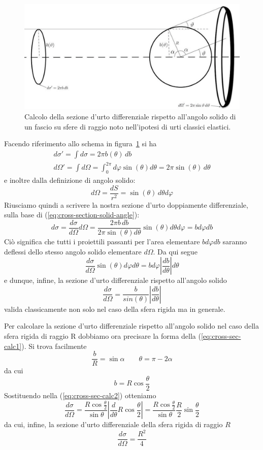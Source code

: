 \begin{figure}
	\centering
	\includegraphics{figs/ex-cross-section}
	\caption{Calcolo della sezione d'urto differenziale rispetto all'angolo solido di un fascio su sfere di raggio noto
	nell'ipotesi di urti classici elastici.}
	\label{fig:ex-cross-section}
\end{figure}
Facendo riferimento allo schema in figura~\ref{fig:ex-cross-section} si ha
\begin{gather*}
    d \sigma' = \int d \sigma = 2 \pi b(\theta) \, db\\
    d \Omega' = \int d \Omega = \int_{0}^{2 \pi} d \varphi \sin(\theta) d \theta = 2 \pi \sin(\theta) \, d \theta
\end{gather*}
e inoltre dalla definizione di angolo solido:
\[
 d \Omega = \frac{dS}{{r}^{2}}= \sin (\theta) \, d \theta d \varphi
\]
Riusciamo quindi a scrivere la nostra sezione d'urto doppiamente differenziale, sulla base di
(\ref{eq:cross-section-solid-angle}):
\[
	d \sigma = \frac{d \sigma}{d \Omega}d \Omega
	= \frac{2 \pi b \, db}{2 \pi \sin(\theta) d \theta} \sin(\theta) d \theta d \varphi
	=  b d \varphi db
\]
Ciò significa che tutti i proiettili passanti per l'area elementare $bd \varphi db$ saranno deflessi dello stesso angolo
solido elementare $d \Omega$.
Da qui segue
\[
	\frac{d \sigma }{d \Omega} \sin (\theta) d \varphi d \theta   =  b d \varphi \left |\frac{db}{d \theta}\right | d \theta
\]
e dunque, infine, la sezione d'urto differenziale rispetto all'angolo solido
\begin{equation}
	\frac{d \sigma}{d \Omega} = \frac{b}{sin (\theta)}\left |\frac{db}{d \theta}\right |
	\label{eq:cross-sec-calc2}
\end{equation} valida classicamente non solo nel caso della sfera rigida ma in generale.

Per calcolare la sezione d'urto differenziale rispetto all'angolo solido nel caso della sfera rigida di raggio R dobbiamo
ora precisare la forma della (\ref{eq:cross-sec-calc1}).
Si trova facilmente
\[
	\frac{b}{R} = \sin{\alpha}  \qquad \theta = \pi - 2 \alpha
\]
da cui
\[
	b = R \cos{\frac{\theta}{2}}
\]
Sostituendo nella (\ref{eq:cross-sec-calc2}) otteniamo
\[
	\frac{d \sigma}{d \Omega} = \frac{R \cos{\frac{\theta}{2}}}{\sin \theta} \left | \frac{d}{d \theta}R \cos{\frac{\theta}{2}} \right | = \frac{R \cos{\frac{\theta}{2}}}{\sin \theta}\frac{R}{2} \sin \frac{\theta}{2}
\]
da cui, infine, la sezione d'urto differenziale della sfera rigida di raggio $R$
\begin{equation}
	\frac{d \sigma}{d \Omega} = \frac{R^2}{4}
	\label{eq:cross-section-rigid-sphere}
\end{equation}

